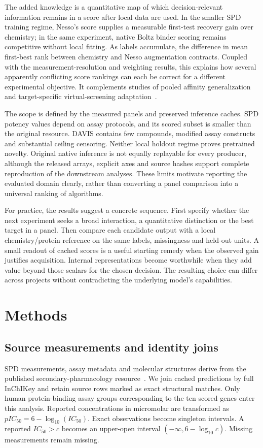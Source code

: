 \documentclass[pdflatex, sn-nature]{sn-jnl}
\begin{document}
The added knowledge is a quantitative map of which decision-relevant information remains in a score after local data are used. In the smaller SPD training regime, Nesso's score supplies a measurable first-test recovery gain over chemistry; in the same experiment, native Boltz binder scoring remains competitive without local fitting. As labels accumulate, the difference in mean first-best rank between chemistry and Nesso augmentation contracts. Coupled with the measurement-resolution and weighting results, this explains how several apparently conflicting score rankings can each be correct for a different experimental objective. It complements studies of pooled affinity generalization and target-specific virtual-screening adaptation~\cite{yazdani2026mirage,furui2026boltzadaptation}.

The scope is defined by the measured panels and preserved inference caches. SPD potency values depend on assay protocols, and its scored subset is smaller than the original resource. DAVIS contains few compounds, modified assay constructs and substantial ceiling censoring. Neither local holdout regime proves pretrained novelty. Original native inference is not equally replayable for every producer, although the released arrays, explicit axes and source hashes support complete reproduction of the downstream analyses. These limits motivate reporting the evaluated domain clearly, rather than converting a panel comparison into a universal ranking of algorithms.

For practice, the results suggest a concrete sequence. First specify whether the next experiment seeks a broad interaction, a quantitative distinction or the best target in a panel. Then compare each candidate output with a local chemistry/protein reference on the same labels, missingness and held-out units. A small readout of cached scores is a useful starting remedy when the observed gain justifies acquisition. Internal representations become worthwhile when they add value beyond those scalars for the chosen decision. The resulting choice can differ across projects without contradicting the underlying model's capabilities.

\section{Methods}
\subsection{Source measurements and identity joins}
SPD measurements, assay metadata and molecular structures derive from the published secondary-pharmacology resource~\cite{sutherland2023spd}. We join cached predictions by full InChIKey and retain source rows marked as exact structural matches. Only human protein-binding assay groups corresponding to the ten scored genes enter this analysis. Reported concentrations in micromolar are transformed as $pIC_{50}=6-\log_{10}(IC_{50})$. Exact observations become singleton intervals. A reported $IC_{50}>c$ becomes an upper-open interval $(-\infty, 6-\log_{10}c)$. Missing measurements remain missing.
\end{document}
